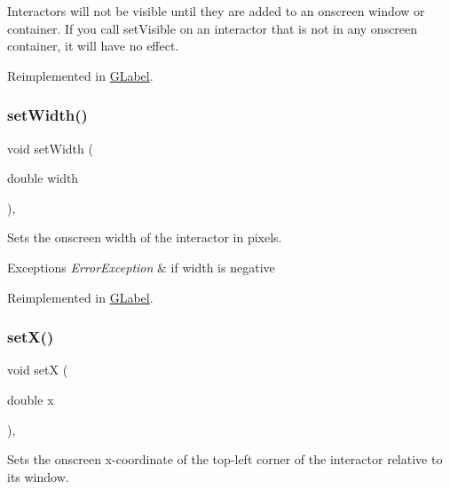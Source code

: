 Interactors will not be visible until they are added to an onscreen window or container. If you call set\+Visible on an interactor that is not in any onscreen container, it will have no effect. 

Reimplemented in \mbox{\hyperlink{classGLabel_afcc2a51afef8e2e61d8d9191386fb93f}{G\+Label}}.

\mbox{\label{classGInteractor_aa3f3fba4cb131baa8696ba01e3bceca1}} 
\subsubsection{\texorpdfstring{set\+Width()}{setWidth()}}
{\footnotesize\ttfamily void set\+Width (\begin{DoxyParamCaption}\item[{double}]{width }\end{DoxyParamCaption})\hspace{0.3cm}{\ttfamily [virtual]}, {\ttfamily [inherited]}}



Sets the onscreen width of the interactor in pixels. 


\begin{DoxyExceptions}{Exceptions}
{\em Error\+Exception} & if width is negative \\
\hline
\end{DoxyExceptions}


Reimplemented in \mbox{\hyperlink{classGLabel_af0c5b6fb4e3c3c9a3fabde548efa93db}{G\+Label}}.

\mbox{\label{classGInteractor_a9c18fcc579333bf9653d13ad2b372e39}} 
\subsubsection{\texorpdfstring{set\+X()}{setX()}}
{\footnotesize\ttfamily void setX (\begin{DoxyParamCaption}\item[{double}]{x }\end{DoxyParamCaption})\hspace{0.3cm}{\ttfamily [virtual]}, {\ttfamily [inherited]}}



Sets the onscreen x-\/coordinate of the top-\/left corner of the interactor relative to its window. 

